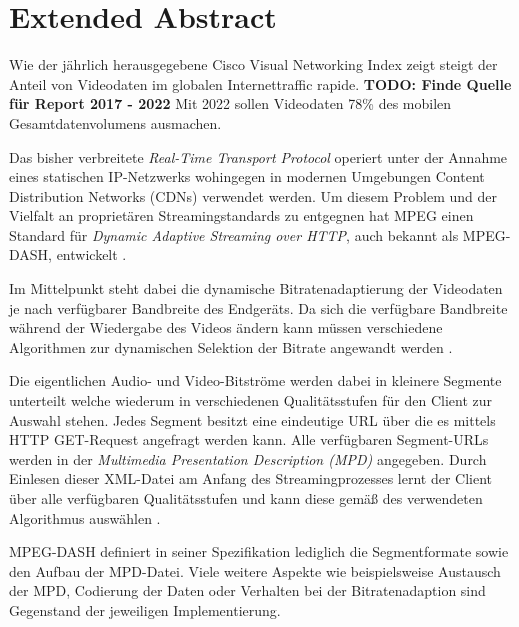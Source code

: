 \documentclass[paper = a4, fontsize = 12pt, parskip = half]{scrartcl} %
\begin{document}





\setcounter{page}{1}
\onehalfspacing

\section*{Extended Abstract}
Wie der jährlich herausgegebene Cisco Visual Networking Index \cite{noauthor_cisco_nodate} zeigt steigt der Anteil von Videodaten im globalen Internettraffic rapide. \textbf{TODO: Finde Quelle für Report 2017 - 2022} Mit 2022 sollen Videodaten 78\% des mobilen Gesamtdatenvolumens ausmachen.

Das bisher verbreitete \textit{Real-Time Transport Protocol} operiert unter der Annahme eines statischen IP-Netzwerks wohingegen in modernen Umgebungen Content Distribution Networks (CDNs) verwendet werden. Um diesem Problem und der Vielfalt an proprietären Streamingstandards zu entgegnen hat MPEG einen Standard für \textit{Dynamic Adaptive Streaming over HTTP}, auch bekannt als MPEG-DASH, entwickelt \cite{sodagar_mpeg-dash_2011}.

Im Mittelpunkt steht dabei die dynamische Bitratenadaptierung der Videodaten je nach verfügbarer Bandbreite des Endgeräts. Da sich die verfügbare Bandbreite während der Wiedergabe des Videos ändern kann müssen verschiedene Algorithmen zur dynamischen Selektion der Bitrate angewandt werden \cite{bentaleb_survey_2019}.

Die eigentlichen Audio- und Video-Bitströme werden dabei in kleinere Segmente unterteilt welche wiederum in verschiedenen Qualitätsstufen für den Client zur Auswahl stehen. Jedes Segment besitzt eine eindeutige URL über die es mittels HTTP GET-Request angefragt werden kann. Alle verfügbaren Segment-URLs werden in der \textit{Multimedia Presentation Description (MPD)} angegeben. Durch Einlesen dieser XML-Datei am Anfang des Streamingprozesses lernt der Client über alle verfügbaren Qualitätsstufen und kann diese gemäß des verwendeten Algorithmus auswählen \cite{sodagar_mpeg-dash_2011}.

MPEG-DASH definiert in seiner Spezifikation lediglich die Segmentformate sowie den Aufbau der MPD-Datei. Viele weitere Aspekte wie beispielsweise Austausch der MPD, Codierung der Daten oder Verhalten bei der Bitratenadaption sind Gegenstand der jeweiligen Implementierung. \cite{sodagar_mpeg-dash_2011}



\printbibliography
\end{document}
